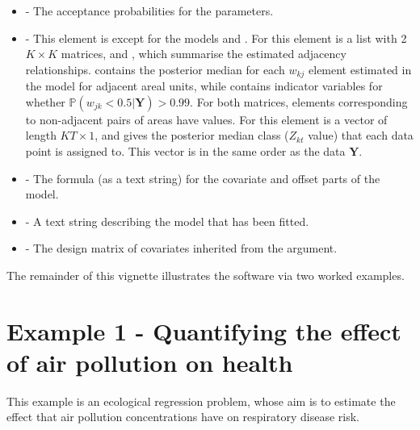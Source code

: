 \documentclass[article, nojss]{jss}
\begin{document}
\begin{itemize}
\item {} - The acceptance probabilities for the parameters.

\item {} - This element is  except for the models  and . For  this element is a list with 2 $K \times K$ matrices,  and , which summarise the estimated adjacency relationships.  contains the posterior median for each $w_{kj}$ element estimated in the model for adjacent areal units, while  contains indicator variables for whether $\mathbb{P}(w_{jk} < 0.5|\mathbf{Y})>0.99$. For both matrices, elements corresponding to non-adjacent pairs of areas have  values. For  this element is a vector of length $KT\times 1$, and gives the posterior median class ($Z_{kt}$ value) that each data point is assigned to. This vector is in the same order as the data $\mathbf{Y}$.
        
\item {} - The formula (as a text string) for the covariate and offset parts of the model.

\item {} - A text string describing the model that has been fitted.

\item {} - The design matrix of covariates inherited from the  argument.
\end{itemize}



The remainder of this vignette illustrates the  software via two worked examples.




\section{Example 1 - Quantifying the effect of air pollution on health}\label{section4}
This example is an ecological regression problem, whose aim is to estimate the effect that air pollution concentrations have on respiratory disease risk. 
\end{document}

